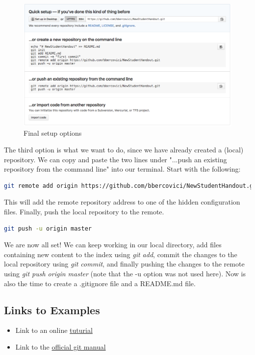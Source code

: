 \begin{figure}[H]
\centering
\includegraphics[scale=0.4]{setup_options}
\caption{Final setup options}
\label{fig:setup_options}
\end{figure}
The third option is what we want to do, since we have already created a (local) repository. We can copy and paste the two lines under "...push an existing repository from the command line" into our terminal. Start with the following:
\begin{lstlisting}[language=bash, caption=Add the remote repository location ]
git remote add origin https://github.com/bbercovici/NewStudentHandout.git
\end{lstlisting}
This will add the remote repository address to one of the hidden configuration files. Finally, push the local repository to the remote.

\begin{lstlisting}[language=bash, caption=Push the local repository to the remote ]
git push -u origin master
\end{lstlisting}

We are now all set! We can keep working in our local directory, add files containing new content to the index using \textit{git add}, commit the changes to the local repository using \textit{git commit}, and finally pushing the changes to the remote using \textit{git push origin master} (note that the -u option was not used here). Now is also the time to create a .gitignore file and a README.md file.

\subsection{Links to Examples}

\begin{itemize}
\item Link to an online \href{https://try.github.io/levels/1/challenges/1}{tuturial}
\item Link to the \href{https://git-scm.com/documentation}{official git manual}
\end{itemize}